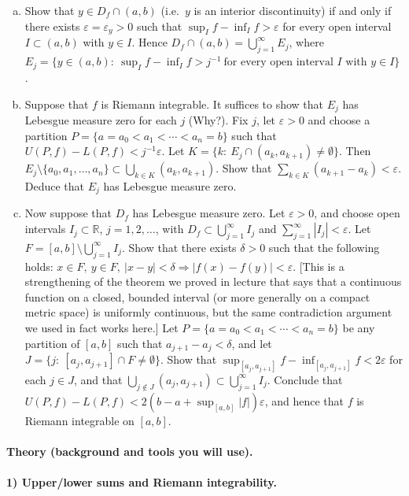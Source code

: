 \documentclass[12pt,a4paper]{article}
\theoremstyle{plain}
\theoremstyle{definition}
\theoremstyle{remark}
\theoremstyle{remark}
\begin{document}
\begin{enumerate}[(a)]
	\item Show that $y\in D_f\cap(a,b)$ (i.e.\ $y$ is an interior discontinuity) if and only if there exists $\varepsilon=\varepsilon_y>0$ such that $\sup_I f-\inf_I f>\varepsilon$ for every open interval $I\subset (a,b)$ with $y\in I$. Hence $D_f\cap(a,b)=\bigcup_{j=1}^\infty E_j$, where $E_j=\{y\in(a,b):\ \sup_I f-\inf_I f>j^{-1}\ \text{for every open interval }I\text{ with }y\in I\}$.
	\item Suppose that $f$ is Riemann integrable. It suffices to show that $E_j$ has Lebesgue measure zero for each $j$ (Why?). Fix $j$, let $\varepsilon>0$ and choose a partition $P=\{a=a_0<a_1<\cdots<a_n=b\}$ such that $U(P,f)-L(P,f)<j^{-1}\varepsilon$. Let $K=\{k:\ E_j\cap(a_k,a_{k+1})\neq\emptyset\}$. Then $E_j\setminus\{a_0,a_1,\dots,a_n\}\subset\bigcup_{k\in K}(a_k,a_{k+1})$. Show that $\sum_{k\in K}(a_{k+1}-a_k)<\varepsilon$. Deduce that $E_j$ has Lebesgue measure zero.
	\item Now suppose that $D_f$ has Lebesgue measure zero. Let $\varepsilon>0$, and choose open intervals $I_j\subset\mathbb{R}$, $j=1,2,\dots$, with $D_f\subset\bigcup_{j=1}^\infty I_j$ and $\sum_{j=1}^\infty |I_j|<\varepsilon$. Let $F=[a,b]\setminus\bigcup_{j=1}^\infty I_j$. Show that there exists $\delta>0$ such that the following holds: $x\in F,\ y\in F,\ |x-y|<\delta \Rightarrow |f(x)-f(y)|<\varepsilon$. [This is a strengthening of the theorem we proved in lecture that says that a continuous function on a closed, bounded interval (or more generally on a compact metric space) is uniformly continuous, but the same contradiction argument we used in fact works here.] Let $P=\{a=a_0<a_1<\cdots<a_n=b\}$ be any partition of $[a,b]$ such that $a_{j+1}-a_j<\delta$, and let $J=\{j:\ [a_j,a_{j+1}]\cap F\neq\emptyset\}$. Show that $\sup_{[a_j,a_{j+1}]} f-\inf_{[a_j,a_{j+1}]} f<2\varepsilon$ for each $j\in J$, and that $\bigcup_{j\notin J}(a_j,a_{j+1})\subset\bigcup_{j=1}^\infty I_j$. Conclude that $U(P,f)-L(P,f)<2(b-a+\sup_{[a,b]}|f|)\varepsilon$, and hence that $f$ is Riemann integrable on $[a,b]$.
\end{enumerate}

\paragraph{Theory (background and tools you will use).}

\paragraph{1) Upper/lower sums and Riemann integrability.}\mbox{}\par
\end{document}
